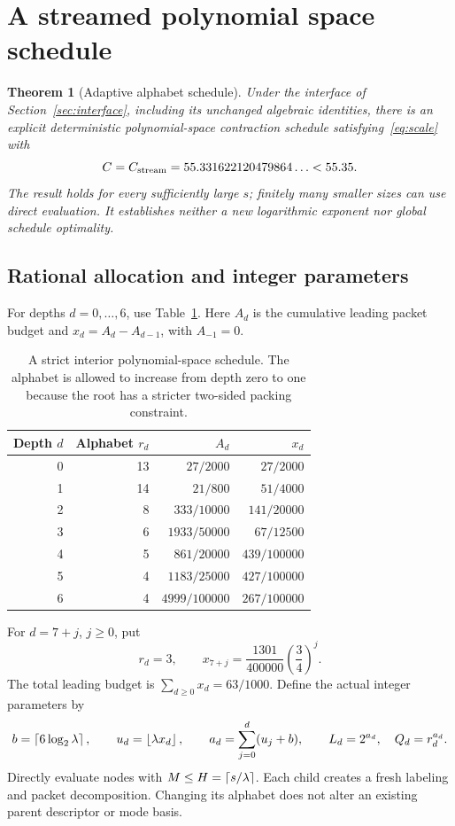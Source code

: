 \documentclass[11pt,letterpaper]{article}
\newtheorem{theorem}{Theorem}[section]\newtheorem{lemma}[theorem]{Lemma}\newtheorem{proposition}[theorem]{Proposition}\newtheorem{corollary}[theorem]{Corollary}
\theoremstyle{remark}\newtheorem{remark}[theorem]{Remark}
\begin{document}
\section{A streamed polynomial space schedule}
\label{sec:schedule}
\begin{theorem}[Adaptive alphabet schedule]\label{thm:adaptive}
Under the interface of Section~\ref{sec:interface}, including its unchanged algebraic identities, there is an explicit deterministic polynomial-space contraction schedule satisfying~\eqref{eq:scale} with
\[
 C=C_{\rm stream}=55.331622120479864\ldots<55.35.
\]
The result holds for every sufficiently large $s$; finitely many smaller sizes can use direct evaluation. It establishes neither a new logarithmic exponent nor global schedule optimality.
\end{theorem}

\subsection{Rational allocation and integer parameters}
For depths $d=0,\ldots,6$, use Table~\ref{tab:schedule}. Here $A_d$ is the cumulative leading packet budget and $x_d=A_d-A_{d-1}$, with $A_{-1}=0$.
\begin{table}[htbp]\centering
\begin{tabular}{@{}rrrr@{}}\toprule
Depth $d$ & Alphabet $r_d$ & $A_d$ & $x_d$\\\midrule
0&13&$27/2000$&$27/2000$\\
1&14&$21/800$&$51/4000$\\
2&8&$333/10000$&$141/20000$\\
3&6&$1933/50000$&$67/12500$\\
4&5&$861/20000$&$439/100000$\\
5&4&$1183/25000$&$427/100000$\\
6&4&$4999/100000$&$267/100000$\\\bottomrule
\end{tabular}
\caption{A strict interior polynomial-space schedule. The alphabet is allowed to increase from depth zero to one because the root has a stricter two-sided packing constraint.}\label{tab:schedule}
\end{table}
For $d=7+j$, $j\ge0$, put
\begin{equation}\label{eq:tail}
 r_d=3,\qquad x_{7+j}=\frac{1301}{400000}\left(\frac34\right)^j.
\end{equation}
The total leading budget is $\sum_{d\ge0}x_d=63/1000$. Define the actual integer parameters by
\[
 b=\left\lceil6\log_2\lambda\right\rceil,\qquad u_d=\left\lfloor\lambda x_d\right\rfloor,\qquad
 a_d=\sum_{j=0}^d(u_j+b),\qquad L_d=2^{a_d},\quad Q_d=r_d^{a_d}.
\]
Directly evaluate nodes with $M\le H=\left\lceil s/\lambda\right\rceil$. Each child creates a fresh labeling and packet decomposition. Changing its alphabet does not alter an existing parent descriptor or mode basis.
\end{document}
